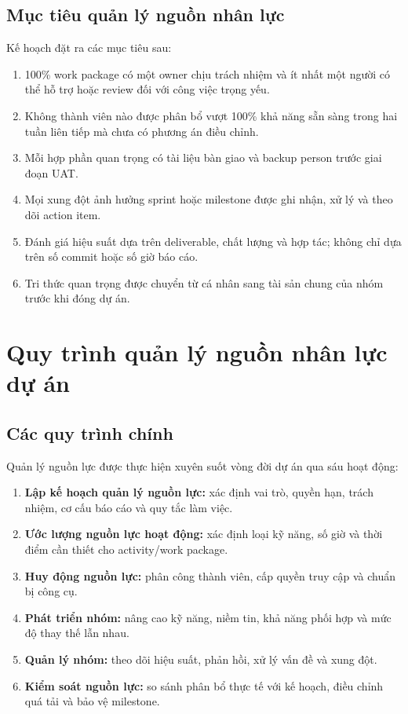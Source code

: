 \subsection{Mục tiêu quản lý nguồn nhân lực}

Kế hoạch đặt ra các mục tiêu sau:

\begin{enumerate}
  \item 100\% work package có một owner chịu trách nhiệm và ít nhất một người có thể hỗ trợ hoặc review đối với công việc trọng yếu.
  \item Không thành viên nào được phân bổ vượt 100\% khả năng sẵn sàng trong hai tuần liên tiếp mà chưa có phương án điều chỉnh.
  \item Mỗi hợp phần quan trọng có tài liệu bàn giao và backup person trước giai đoạn UAT.
  \item Mọi xung đột ảnh hưởng sprint hoặc milestone được ghi nhận, xử lý và theo dõi action item.
  \item Đánh giá hiệu suất dựa trên deliverable, chất lượng và hợp tác; không chỉ dựa trên số commit hoặc số giờ báo cáo.
  \item Tri thức quan trọng được chuyển từ cá nhân sang tài sản chung của nhóm trước khi đóng dự án.
\end{enumerate}

\section{Quy trình quản lý nguồn nhân lực dự án}

\subsection{Các quy trình chính}

Quản lý nguồn lực được thực hiện xuyên suốt vòng đời dự án qua sáu hoạt động:

\begin{enumerate}
  \item \textbf{Lập kế hoạch quản lý nguồn lực:} xác định vai trò, quyền hạn, trách nhiệm, cơ cấu báo cáo và quy tắc làm việc.
  \item \textbf{Ước lượng nguồn lực hoạt động:} xác định loại kỹ năng, số giờ và thời điểm cần thiết cho activity/work package.
  \item \textbf{Huy động nguồn lực:} phân công thành viên, cấp quyền truy cập và chuẩn bị công cụ.
  \item \textbf{Phát triển nhóm:} nâng cao kỹ năng, niềm tin, khả năng phối hợp và mức độ thay thế lẫn nhau.
  \item \textbf{Quản lý nhóm:} theo dõi hiệu suất, phản hồi, xử lý vấn đề và xung đột.
  \item \textbf{Kiểm soát nguồn lực:} so sánh phân bổ thực tế với kế hoạch, điều chỉnh quá tải và bảo vệ milestone.
\end{enumerate}

